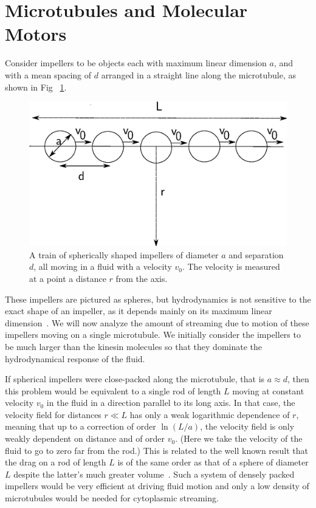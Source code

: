 \documentclass[11pt]{ucthesis}
\begin{document}
\section{Microtubules and Molecular Motors}
Consider impellers to be objects each with maximum linear dimension
$a$, and with a mean spacing of $d$ arranged in a straight line along the microtubule, as shown in Fig ~\ref{fig:spheres}. 

\begin{figure}[htp]
\begin{center}
\includegraphics[width=\hsize]{spheres.eps}
\caption{ 
A train of spherically shaped impellers of diameter $a$ and separation $d$, all moving in a fluid with a velocity $v_0$.
The velocity is measured at a point a distance $r$ from the axis.
}
\label{fig:spheres}
\end{center}
\end{figure}

These impellers are pictured as spheres, but hydrodynamics is not sensitive to
the exact shape of an impeller, as it depends mainly on its maximum linear dimension~\cite{BergRandomWalksinBiology}. 
We will
now analyze the amount of streaming due to motion of these impellers
moving on a single microtubule. We initially consider the impellers to be much larger than
the kinesin molecules so that they dominate the hydrodynamical response
of the fluid.

If spherical impellers were close-packed along the microtubule, that is $a \approx
d$, then this problem would be equivalent to a single rod of length $L$
moving at constant velocity $v_0$ in the fluid in a direction parallel
to its long axis.  In that case, the velocity field for distances
$r \ll L$ has only a weak logarithmic dependence of $r$, meaning that up
to a correction of order $\ln(L/a)$, the velocity field is only weakly
dependent on distance and of order $v_0$. (Here we take the velocity of the fluid
to go to zero far from the rod.)
This is related to the well
known result that the drag on a rod of length $L$ is of the same order
as that of a sphere of diameter $L$ despite the latter's much greater volume~\cite{BergRandomWalksinBiology}. Such a system of densely packed impellers would
be very efficient at driving fluid motion and only a low density of microtubules
would be needed for cytoplasmic streaming.
\end{document}
